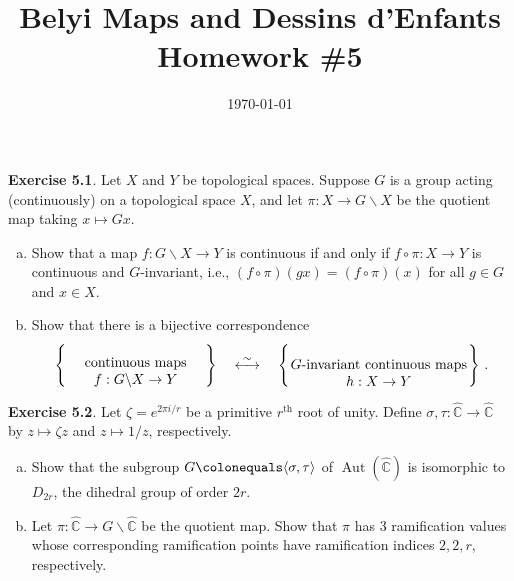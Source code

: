 \documentclass[12pt]{amsart}
\newenvironment{exolab}[1]
{\noindent\textbf{Exercise #1}.}
{\vskip 6pt}
\theoremstyle{remark}
\newcommand{\C}{\mathbb C}
\newcommand{\wh}{\widehat}
\DeclareMathOperator{\Aut}{Aut}
\begin{document}
\title{Belyi Maps and Dessins d'Enfants \\ Homework \#5}
\date{\today}


\maketitle

\begin{exolab}{5.1}
  Let $X$ and $Y$ be topological spaces. Suppose $G$ is a group acting (continuously) on a topological space $X$, and let $\pi: X \to G \backslash X$ be the quotient map taking $x \mapsto Gx$.
  \begin{enumerate}[(a)]
    \item 
      Show that a map $f: G \backslash X \to Y$ is continuous if and only if $f \circ \pi: X \to Y$ is continuous and $G$-invariant, i.e., $(f \circ \pi)(gx) = (f \circ \pi)(x)$ for all $g \in G$ and $x \in X$.
    \item
      Show that there is a bijective correspondence
      \begin{equation*}
        \left\{
          \parbox{35mm}{
            \center
            continuous maps $f: G \backslash X \to Y$
          }
        \right\}
        \quad
        \overset{\sim}{\longleftrightarrow}
        \quad
        \left\{
          \parbox{45mm}{
            \center
            $G$-invariant continuous maps $h: X \to Y$
          }
        \right\} \, .
      \end{equation*}
  \end{enumerate}
\end{exolab}

\begin{exolab}{5.2}
  Let $\zeta = e^{2\pi i/r}$ be a primitive $r^\text{th}$ root of unity. Define $\sigma, \tau: \wh{\C} \to \wh{\C}$ by $z \mapsto \zeta z$ and $z \mapsto 1/z$, respectively.
  \begin{enumerate}[(a)]
    \item 
      Show that the subgroup $G \colonequals \langle \sigma, \tau \rangle$ of $\Aut(\wh{\C})$ is isomorphic to $D_{2r}$, the dihedral group of order $2r$.
    \item
      Let $\pi: \wh{\C} \to G \backslash \wh{\C}$ be the quotient map. Show that $\pi$ has $3$ ramification values whose corresponding ramification points have ramification indices $2,2,r$, respectively.
  \end{enumerate}
\end{exolab}
\end{document}
